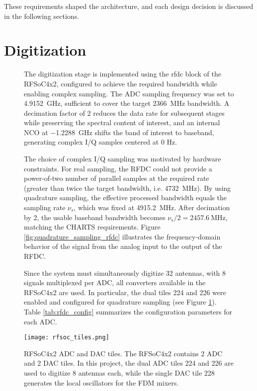 These requirements shaped the architecture, and each design decision is discussed in the following sections.  

\newpage
\section{Digitization}
\label{sec:digitization}

\begin{figure}[h!]
\centering
\begin{minipage}{0.5\textwidth}
The digitization stage is implemented using the \gls{rfdc} block of the RFSoC4x2, configured to achieve the required bandwidth while enabling complex sampling. The ADC sampling frequency was set to \SI{4.9152}{\giga\hertz}, sufficient to cover the target \SI{2366}{\mega\hertz} bandwidth. A decimation factor of 2 reduces the data rate for subsequent stages while preserving the spectral content of interest, and an internal NCO at \SI{-1.2288}{\giga\hertz} shifts the band of interest to baseband, generating complex I/Q samples centered at 0 Hz.

The choice of complex I/Q sampling was motivated by hardware constraints. For real sampling, the RFDC could not provide a power-of-two number of parallel samples at the required rate (greater than twice the target bandwidth, i.e. \SI{4732}{\mega\hertz}). By using quadrature sampling, the effective processed bandwidth equals the sampling rate $\nu_s$, which was fixed at \SI{4915.2}{\mega\hertz}. After decimation by 2, the usable baseband bandwidth becomes $\nu_s/2=\SI{2457.6}{\mega\hertz}$, matching the CHARTS requirements. Figure \ref{fig:quadrature_sampling_rfdc} illustrates the frequency-domain behavior of the signal from the analog input to the output of the RFDC.

Since the system must simultaneously digitize 32 antennas, with 8 signals multiplexed per ADC, all converters available in the RFSoC4x2 are used. In particular, the dual tiles 224 and 226 were enabled and configured for quadrature sampling (see Figure \ref{fig:rfsoc_tiles}). Table \ref{tab:rfdc_config} summarizes the configuration parameters for each ADC.
\end{minipage}
\hfill
\begin{minipage}{0.45\textwidth}
\centering
\texttt{[image: rfsoc\_tiles.png]}
\caption[RFSoC4x2 ADC and DAC tiles]{RFSoC4x2 ADC and DAC tiles. The RFSoC4x2 contains 2 ADC and 2 DAC tiles. In this project, the dual ADC tiles 224 and 226 are used to digitize 8 antennas each, while the single DAC tile 228 generates the local oscillators for the FDM mixers.}
\label{fig:rfsoc_tiles}
\end{minipage}
\end{figure}

